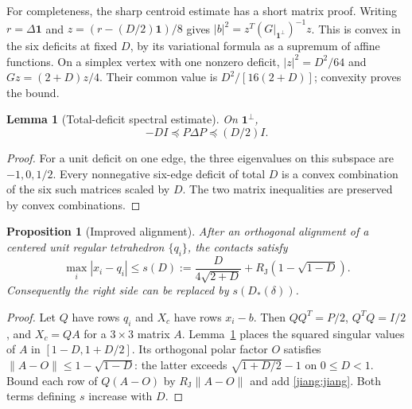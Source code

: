 \documentclass[11pt]{article}
\newtheorem{lemma}[theorem]{Lemma}
\newtheorem{proposition}[theorem]{Proposition}
\theoremstyle{remark}\newtheorem{remark}[theorem]{Remark}
\newcommand{\RJ}{R_{\mathrm J}}
\begin{document}
For completeness, the sharp centroid estimate has a short matrix proof.
Writing $r=\Delta\mathbf1$ and $z=(r-(D/2)\mathbf1)/8$ gives
$|b|^2=z^T(G|_{\mathbf1^\perp})^{-1}z$.
This is convex in the six deficits at fixed $D$, by its variational
formula as a supremum of affine functions. On a simplex vertex with
one nonzero deficit, $|z|^2=D^2/64$ and $Gz=(2+D)z/4$.
Their common value is $D^2/[16(2+D)]$; convexity proves the bound.

\begin{lemma}[Total-deficit spectral estimate]\label{jiang:spectral}
On $\mathbf1^\perp$,
\[
 -D I\preceq P\Delta P\preceq (D/2)I.
\]
\end{lemma}
\begin{proof}
For a unit deficit on one edge, the three eigenvalues on this subspace
are $-1,0,1/2$. Every nonnegative six-edge deficit of total $D$ is a
convex combination of the six such matrices scaled by $D$. The two
matrix inequalities are preserved by convex combinations.
\end{proof}

\begin{proposition}[Improved alignment]\label{jiang:align}
After an orthogonal alignment of a centered unit regular tetrahedron
$\{q_i\}$, the contacts satisfy
\[
 \max_i|x_i-q_i|\leq s(D):=
 \frac{D}{4\sqrt{2+D}}+\RJ(1-\sqrt{1-D}).
\]
Consequently the right side can be replaced by $s(D_*(\delta))$.
\end{proposition}
\begin{proof}
Let $Q$ have rows $q_i$ and $X_c$ have rows $x_i-b$. Then
$QQ^T=P/2$, $Q^TQ=I/2$, and $X_c=QA$ for a $3\times3$ matrix $A$.
Lemma~\ref{jiang:spectral} places the squared singular values of $A$ in
$[1-D,1+D/2]$. Its orthogonal polar factor $O$ satisfies
$\|A-O\|\leq1-\sqrt{1-D}$: the latter exceeds
$\sqrt{1+D/2}-1$ on $0\leq D<1$. Bound each row of $Q(A-O)$ by
$\RJ\|A-O\|$ and add \eqref{jiang:jiang}. Both terms defining $s$ increase
with $D$.
\end{proof}
\end{document}
